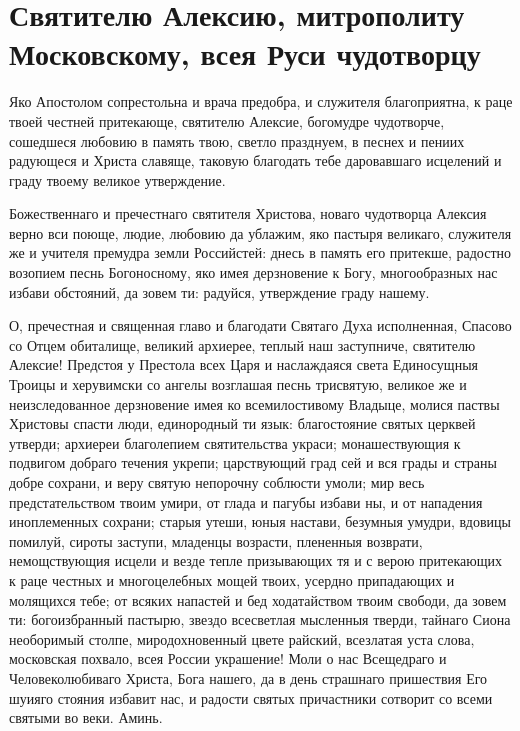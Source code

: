 \section{Святителю Алексию, митрополиту Московскому, всея Руси чудотворцу}\begin{mymulticols}


Яко Апостолом сопрестольна и врача предобра, и служителя благоприятна, к раце твоей честней притекающе, святителю Алексие, богомудре чудотворче, сошедшеся любовию в память твою, светло празднуем, в песнех и пениих радующеся и Христа славяще, таковую благодать тебе даровавшаго исцелений и граду твоему великое утверждение.


Божественнаго и пречестнаго святителя Христова, новаго чудотворца Алексия верно вси поюще, людие, любовию да ублажим, яко пастыря великаго, служителя же и учителя премудра земли Российстей: днесь в память его притекше, радостно возопием песнь Богоносному, яко имея дерзновение к Богу, многообразных нас избави обстояний, да зовем ти: радуйся, утверждение граду нашему.


О, пречестная и священная главо и благодати Святаго Духа исполненная, Спасово со Отцем обиталище, великий архиерее, теплый наш заступниче, святителю Алексие! Предстоя у Престола всех Царя и наслаждаяся света Единосущныя Троицы и херувимски со ангелы возглашая песнь трисвятую, великое же и неизследованное дерзновение имея ко всемилостивому Владыце, молися паствы Христовы спасти люди, единородный ти язык: благостояние святых церквей утверди; архиереи благолепием святительства украси; монашествующия к подвигом добраго течения укрепи; царствующий град сей  и вся грады и страны добре сохрани, и веру святую непорочну соблюсти умоли; мир весь предстательством твоим умири, от глада и пагубы избави ны, и от нападения иноплеменных сохрани; старыя утеши, юныя настави, безумныя умудри, вдовицы помилуй, сироты заступи, младенцы возрасти, плененныя возврати, немощствующия исцели и везде тепле призывающих тя и с верою притекающих к раце честных и многоцелебных мощей твоих, усердно припадающих и молящихся тебе; от всяких напастей и бед ходатайством твоим свободи, да зовем ти: богоизбранный пастырю, звездо всесветлая мысленныя тверди, тайнаго Сиона необоримый столпе, миродохновенный цвете райский, всезлатая уста слова, московская похвало, всея России украшение! Моли о нас Всещедраго и Человеколюбиваго Христа, Бога нашего, да в день страшнаго пришествия Его шуияго стояния избавит нас, и радости святых причастники сотворит со всеми святыми во веки. Аминь.

\end{mymulticols}

